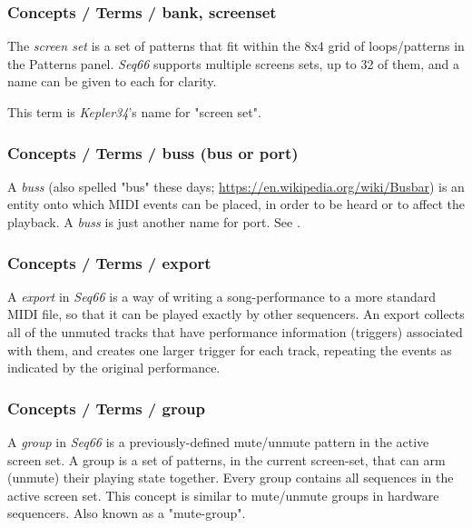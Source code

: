 \subsubsection{Concepts / Terms / bank, screenset}
\label{subsubsec:concepts_terms_bank}

   The \textsl{screen set}
   is a set of patterns that fit within the 8x4 grid of loops/patterns in the
   Patterns panel.
   \textsl{Seq66} supports multiple screens sets, up to 32 of them,
   and a name can be given to each for clarity.

   This term is \textsl{Kepler34}'s name for "screen set".

\subsubsection{Concepts / Terms / buss (bus or port)}
\label{subsubsec:concepts_terms_buss}

   A \textsl{buss} (also spelled "bus" these days;
   \url{https://en.wikipedia.org/wiki/Busbar}) is an entity onto which
   MIDI events can be placed, in order to be heard or to affect the
   playback.
   A \textsl{buss} is just another name for port.
   See .

\subsubsection{Concepts / Terms / export}
\label{subsubsec:concepts_terms_export}

   A \textsl{export} in \textsl{Seq66} is a way of writing a
   song-performance to a more standard MIDI file, so that it can be played
   exactly by other sequencers.
   An export collects all of the unmuted tracks that have
   performance information (triggers) associated with them, and creates one
   larger trigger for each track, repeating the events as indicated by the
   original performance.

\subsubsection{Concepts / Terms / group}
\label{subsubsec:concepts_terms_group}

   A \textsl{group} in \textsl{Seq66} is a
   previously-defined mute/unmute pattern in the active screen set.
   A group is a set of patterns, in the current screen-set,
   that can arm (unmute) their playing state
   together.  Every group contains all sequences in the active screen
   set.  This concept is similar to mute/unmute groups in hardware
   sequencers.
   Also known as a "mute-group".

